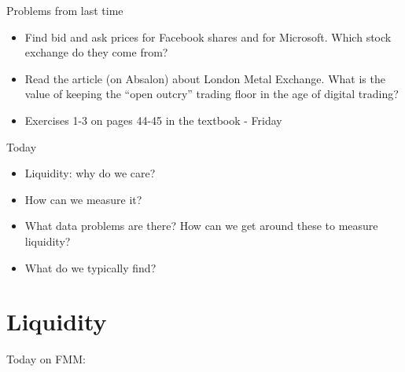 \begin{frame}{Problems from last time}
	\begin{itemize}
		\item Find bid and ask prices for Facebook shares and for Microsoft. Which stock exchange do they come from? 
		\item Read the article (on Absalon) about London Metal Exchange. What is the value of keeping the ``open outcry'' trading floor in the age of digital trading?
		\item Exercises 1-3 on pages 44-45 in the textbook - Friday
	\end{itemize}
\end{frame}


\begin{frame}{Today}
	\begin{itemize}
		\item Liquidity: why do we care?
		\item How can we measure it?
		\item What data problems are there? How can we get around these to measure liquidity?
		\item What do we typically find?
	\end{itemize}
\end{frame}


\section{Liquidity}

\begin{frame}{Today on FMM:}
	\tableofcontents[currentsection]
\end{frame}


